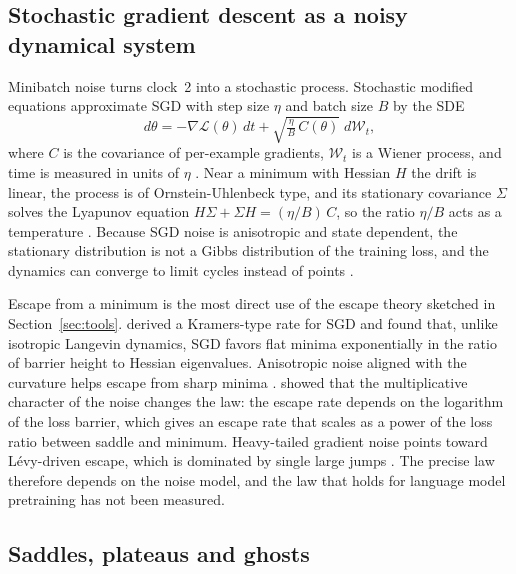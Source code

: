 \subsection{Stochastic gradient descent as a noisy dynamical system}
\label{sec:sgd}

Minibatch noise turns clock~2 into a stochastic process. Stochastic modified equations approximate SGD with step size $\eta$ and batch size $B$ by the SDE
\begin{equation}
d\theta=-\nabla\mathcal{L}(\theta)\,dt+\sqrt{\tfrac{\eta}{B}\,C(\theta)}\;d\mathcal{W}_t ,
\label{eq:sme}
\end{equation}
where $C$ is the covariance of per-example gradients, $\mathcal{W}_t$ is a Wiener process, and time is measured in units of $\eta$ \citep{li2015stochastic}. Near a minimum with Hessian $H$ the drift is linear, the process is of Ornstein-Uhlenbeck type, and its stationary covariance $\Sigma$ solves the Lyapunov equation $H\Sigma+\Sigma H=(\eta/B)\,C$, so the ratio $\eta/B$ acts as a temperature \citep{mandt2017stochastic,smith2017bayesian,jastrzebski2017three}. Because SGD noise is anisotropic and state dependent, the stationary distribution is not a Gibbs distribution of the training loss, and the dynamics can converge to limit cycles instead of points \citep{chaudhari2017stochastic}.

Escape from a minimum is the most direct use of the escape theory sketched in Section~\ref{sec:tools}. \citet{xie2020diffusion} derived a Kramers-type rate for SGD and found that, unlike isotropic Langevin dynamics, SGD favors flat minima exponentially in the ratio of barrier height to Hessian eigenvalues. Anisotropic noise aligned with the curvature helps escape from sharp minima \citep{zhu2018anisotropic}. \citet{mori2021powerlaw} showed that the multiplicative character of the noise changes the law: the escape rate depends on the logarithm of the loss barrier, which gives an escape rate that scales as a power of the loss ratio between saddle and minimum. Heavy-tailed gradient noise points toward L\'evy-driven escape, which is dominated by single large jumps \citep{simsekli2019tailindex}. The precise law therefore depends on the noise model, and the law that holds for language model pretraining has not been measured.

\subsection{Saddles, plateaus and ghosts}

